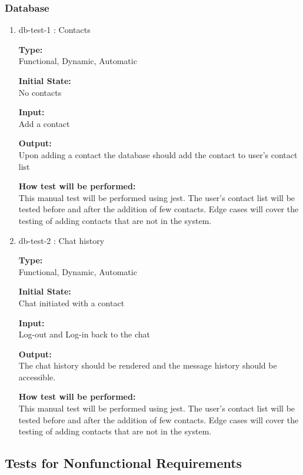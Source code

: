 \documentclass[12pt, titlepage]{article}
\begin{document}
\subsubsection{Database}
\label{sec:backendtests}
\begin{enumerate}
\item{db-test-1 : Contacts\\}

\textbf{Type:}\\ Functional, Dynamic, Automatic
					
\textbf{Initial State:}\\ No contacts
					
\textbf{Input:}\\ Add a contact
					
\textbf{Output:}\\ Upon adding a contact the database should add the contact to user's contact list
					
\textbf{How test will be performed:}\\ 
This manual test will be performed using jest. The user's contact list will be tested before and after the addition of few contacts. Edge cases will cover the testing of adding contacts that are not in the system.

\item{db-test-2 : Chat history\\}

\textbf{Type:}\\ Functional, Dynamic, Automatic
					
\textbf{Initial State:}\\ Chat initiated with a contact
					
\textbf{Input:}\\ Log-out and Log-in back to the chat
					
\textbf{Output:}\\ The chat history should be rendered and the message history should be accessible.
					
\textbf{How test will be performed:}\\ 
This manual test will be performed using jest. The user's contact list will be tested before and after the addition of few contacts. Edge cases will cover the testing of adding contacts that are not in the system.
\end{enumerate}

\subsection{Tests for Nonfunctional Requirements}
\end{document}
